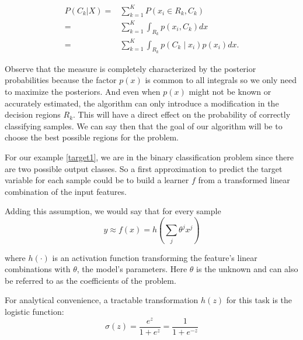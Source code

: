 \begin{equation}\label{eq:goodclassification-equation}
\begin{split}
P(C_k| X) =  & \sum_{k=1}^{K} P(x_i \in R_k, C_k ) \\
		= & \sum_{k=1}^{K} \int_{R_k}p(x_i,C_k) dx \\
		= & \sum_{k=1}^{K} \int_{R_k}p(C_k \mid x_i) p(x_i) dx .
\end{split}
\end{equation}

Observe that the measure is completely characterized by the posterior probabilities because the factor $p(x)$ is common to all integrals so we only need to maximize the posteriors.
And even when $p(x)$ might not be known or accurately estimated, the algorithm can only introduce a modification in the decision regions $R_k$.
This will have a direct effect on the probability of correctly classifying samples.
We can say then that the goal of our algorithm will be to choose the best possible regions for the problem.

For our example \cref{target1}, we are in the binary classification problem since there are two possible output classes.
So a first approximation to predict the target variable for each sample could be to build a learner $f$ from a transformed linear combination of the input features.


Adding this assumption, we would say that for every sample
\begin{equation}
y \approx f(x) = h\left(\sum_{j}\theta^j x^j\right)  \label{formula:1}
\end{equation}

where $h(\cdot)$ is an activation function transforming the feature's linear combinations with $\theta$, the model's parameters.
Here $\theta$ is the unknown and can also be referred to as the coefficients of the problem.
%

For analytical convenience, a tractable transformation $h(z)$ for this task is the logistic function:
\begin{equation}
\sigma(z) = \frac{e^{z}}{1 + e^{z}} = \frac{1}{1 + e^{-z}}
\label{eq:logisticFunction}
\end{equation}

